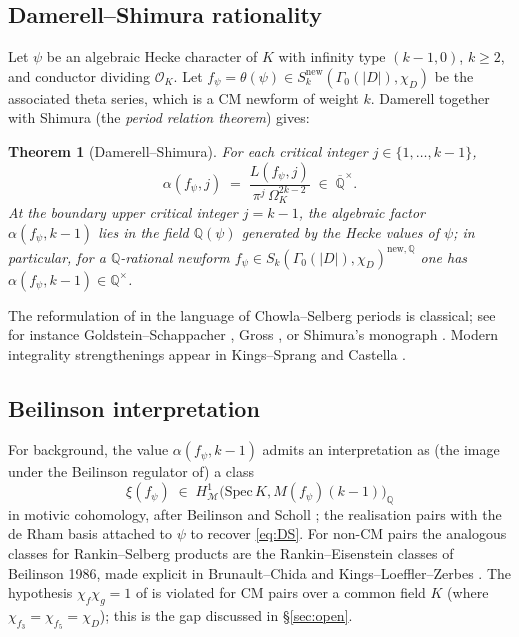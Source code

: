 \documentclass[11pt,a4paper]{amsart}
\theoremstyle{plain}
\newtheorem{theorem}{Theorem}[section]
\theoremstyle{definition}
\newcommand{\Q}{\mathbb{Q}}
\newcommand{\OK}{\mathcal{O}_K}
\newcommand{\HM}{H^1_{\mathcal{M}}}
\newcommand{\Spec}{\mathrm{Spec}\,}
\begin{document}
\subsection{Damerell--Shimura rationality}

Let $\psi$ be an algebraic Hecke character of $K$ with infinity type
$(k-1,0)$, $k\ge 2$, and conductor dividing $\OK$. Let
$f_\psi=\theta(\psi)\in S_k^{\mathrm{new}}(\Gamma_0(|D|),\chi_D)$ be the
associated theta series, which is a CM newform of weight $k$. Damerell
\cite[Theorem~1]{Damerell1971a} together with Shimura
\cite[Thm.~1]{Shimura1976} (the \emph{period relation theorem}) gives:

\begin{theorem}[Damerell--Shimura]
\label{thm:DS}
For each critical integer $j\in\{1,\dots,k-1\}$,
\begin{equation}
\label{eq:DS}
  \alpha(f_\psi,j) \;=\; \frac{L(f_\psi,j)}{\pi^{j}\,\Omega_K^{2k-2}}
  \;\in\;\overline{\Q}^{\times}.
\end{equation}
At the \emph{boundary upper} critical integer $j=k-1$, the algebraic
factor $\alpha(f_\psi,k-1)$ lies in the field $\Q(\psi)$ generated by the
Hecke values of $\psi$; in particular, for a $\Q$-rational newform
$f_\psi\in S_k(\Gamma_0(|D|),\chi_D)^{\mathrm{new},\Q}$ one has
$\alpha(f_\psi,k-1)\in\Q^{\times}$.
\end{theorem}

The reformulation of \cite{Damerell1971a,Damerell1971b} in the language of
Chowla--Selberg periods is classical; see for instance Goldstein--Schappacher
\cite{GoldsteinSchappacher1981}, Gross
\cite[Chap.~II, Thm.~3.1]{Gross1980}, or Shimura's monograph
\cite[Thm.~32.2]{Shimura2000}. Modern integrality strengthenings appear in
Kings--Sprang \cite{KingsSprang2025} and Castella \cite{Castella2025}.

\subsection{Beilinson interpretation}

For background, the value $\alpha(f_\psi,k-1)$ admits an interpretation as
(the image under the Beilinson regulator of) a class
\[
  \xi(f_\psi)\;\in\;\HM\bigl(\Spec K, M(f_\psi)(k-1)\bigr)_{\Q}
\]
in motivic cohomology, after Beilinson \cite{Beilinson1985} and
Scholl \cite{Scholl1990}; the realisation pairs with the de Rham basis
attached to $\psi$ to recover \eqref{eq:DS}. For non-CM pairs the
analogous classes for Rankin--Selberg products are the
Rankin--Eisenstein classes of Beilinson 1986, made explicit in
Brunault--Chida \cite{BrunaultChida2015} and Kings--Loeffler--Zerbes
\cite{KingsLoefflerZerbes2020}. The hypothesis
$\chi_f\chi_g=1$ of \cite[Thm.~9.1]{BrunaultChida2015} is violated for
CM pairs over a common field $K$ (where
$\chi_{f_3}=\chi_{f_5}=\chi_D$); this is the gap discussed in
\S\ref{sec:open}.
\end{document}
